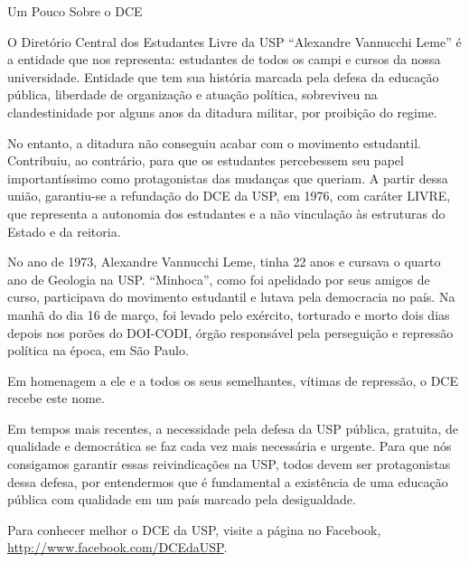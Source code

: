 \begin{secao}{Um Pouco Sobre o DCE}

O Diretório Central dos Estudantes Livre da USP ``Alexandre Vannucchi Leme'' é a
entidade que nos representa: estudantes de todos os campi e cursos da nossa universidade.
Entidade que tem sua história marcada pela defesa da educação pública, liberdade
de organização e atuação política, sobreviveu na clandestinidade por alguns anos
da ditadura militar, por proibição do regime.

No entanto, a ditadura não conseguiu acabar com o movimento estudantil. Contribuiu,
ao contrário, para que os estudantes percebessem seu papel importantíssimo como
protagonistas das mudanças que queriam. A partir dessa união, garantiu-se a
refundação do DCE da USP, em 1976, com caráter LIVRE, que representa a autonomia
dos estudantes e a não vinculação às estruturas do Estado e da reitoria.

No ano de 1973, Alexandre Vannucchi Leme, tinha 22 anos e cursava o quarto ano
de Geologia na USP. ``Minhoca'', como foi apelidado por seus amigos de curso, participava
do movimento estudantil e lutava pela democracia no país. Na manhã do dia 16 de março,
foi levado pelo exército, torturado e morto dois dias depois nos porões do DOI-CODI,
órgão responsável pela perseguição e repressão política na época, em São Paulo.

Em homenagem a ele e a todos os seus semelhantes, vítimas de repressão, o DCE recebe este nome.

Em tempos mais recentes, a necessidade pela defesa da USP pública, gratuita, de qualidade
e democrática se faz cada vez mais necessária e urgente. Para que nós consigamos
garantir essas reivindicações na USP, todos devem ser protagonistas dessa defesa,
por entendermos que é fundamental a existência de uma educação pública com qualidade
em um país marcado pela desigualdade.

Para conhecer melhor o DCE da USP, visite a página no Facebook,
\url{http://www.facebook.com/DCEdaUSP}.

\end{secao}
